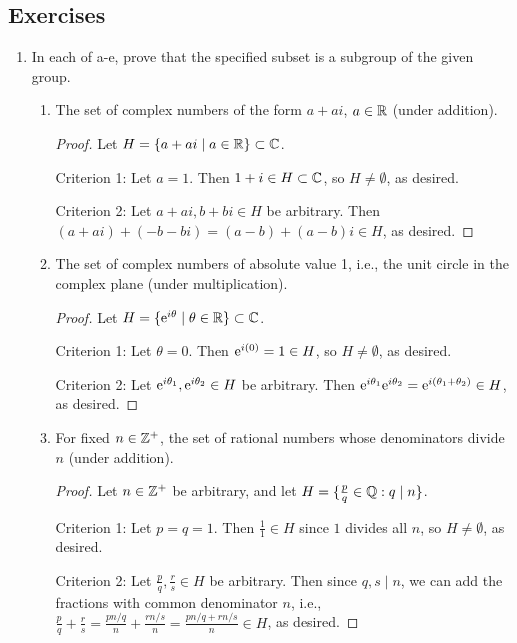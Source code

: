 \documentclass[../notes.tex]{subfiles}
\begin{document}
\subsection*{Exercises}
\begin{enumerate}[label={\textbf{\arabic*.}}]
    \item {}In each of a-e, prove that the specified subset is a subgroup of the given group.
    \begin{enumerate}[label={\textbf{(\alph*)}}]
        \item The set of complex numbers of the form $a+ai$, $a\in\R$ (under addition).
        \begin{proof}
            Let $H=\{a+ai\mid a\in\R\}\subset\C$.\par
            Criterion 1: Let $a=1$. Then $1+i\in H\subset\C$, so $H\neq\emptyset$, as desired.\par
            Criterion 2: Let $a+ai,b+bi\in H$ be arbitrary. Then $(a+ai)+(-b-bi)=(a-b)+(a-b)i\in H$, as desired.
        \end{proof}
        \item The set of complex numbers of absolute value 1, i.e., the unit circle in the complex plane (under multiplication).
        \begin{proof}
            Let $H=\{\e[i\theta]\mid\theta\in\R\}\subset\C$.\par
            Criterion 1: Let $\theta=0$. Then $\e[i(0)]=1\in H$, so $H\neq\emptyset$, as desired.\par
            Criterion 2: Let $\e[i\theta_1],\e[i\theta_2]\in H$ be arbitrary. Then $\e[i\theta_1]\e[i\theta_2]=\e[i(\theta_1+\theta_2)]\in H$, as desired.
        \end{proof}
        \item For fixed $n\in\Z^+$, the set of rational numbers whose denominators divide $n$ (under addition).
        \begin{proof}
            Let $n\in\Z^+$ be arbitrary, and let $H=\{\frac{p}{q}\in\Q:q\mid n\}$.\par
            Criterion 1: Let $p=q=1$. Then $\frac{1}{1}\in H$ since $1$ divides all $n$, so $H\neq\emptyset$, as desired.\par
            Criterion 2: Let $\frac{p}{q},\frac{r}{s}\in H$ be arbitrary. Then since $q,s\mid n$, we can add the fractions with common denominator $n$, i.e., $\frac{p}{q}+\frac{r}{s}=\frac{pn/q}{n}+\frac{rn/s}{n}=\frac{pn/q+rn/s}{n}\in H$, as desired.
        \end{proof}

\end{enumerate}
\end{enumerate}
\end{document}

